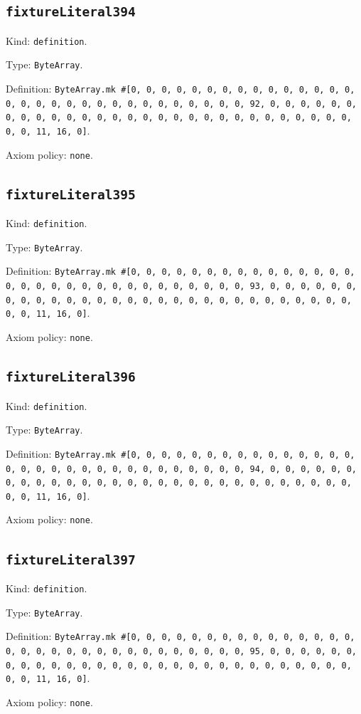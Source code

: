 \documentclass[11pt]{article}
\begin{document}
\subsection*{\texttt{fixtureLiteral394}}
\noindent Kind: \texttt{definition}.\par
\noindent Type: \texttt{ByteArray}.\par
\noindent Definition: \texttt{ByteArray.mk \#[0, 0, 0, 0, 0, 0, 0, 0, 0, 0, 0, 0, 0, 0, 0, 0, 0, 0, 0, 0, 0, 0, 0, 0, 0, 0, 0, 0, 0, 0, 0, 92, 0, 0, 0, 0, 0, 0, 0, 0, 0, 0, 0, 0, 0, 0, 0, 0, 0, 0, 0, 0, 0, 0, 0, 0, 0, 0, 0, 0, 0, 0, 0, 11, 16, 0]}.\par
\noindent Axiom policy: \texttt{none}.\par
\subsection*{\texttt{fixtureLiteral395}}
\noindent Kind: \texttt{definition}.\par
\noindent Type: \texttt{ByteArray}.\par
\noindent Definition: \texttt{ByteArray.mk \#[0, 0, 0, 0, 0, 0, 0, 0, 0, 0, 0, 0, 0, 0, 0, 0, 0, 0, 0, 0, 0, 0, 0, 0, 0, 0, 0, 0, 0, 0, 0, 93, 0, 0, 0, 0, 0, 0, 0, 0, 0, 0, 0, 0, 0, 0, 0, 0, 0, 0, 0, 0, 0, 0, 0, 0, 0, 0, 0, 0, 0, 0, 0, 11, 16, 0]}.\par
\noindent Axiom policy: \texttt{none}.\par
\subsection*{\texttt{fixtureLiteral396}}
\noindent Kind: \texttt{definition}.\par
\noindent Type: \texttt{ByteArray}.\par
\noindent Definition: \texttt{ByteArray.mk \#[0, 0, 0, 0, 0, 0, 0, 0, 0, 0, 0, 0, 0, 0, 0, 0, 0, 0, 0, 0, 0, 0, 0, 0, 0, 0, 0, 0, 0, 0, 0, 94, 0, 0, 0, 0, 0, 0, 0, 0, 0, 0, 0, 0, 0, 0, 0, 0, 0, 0, 0, 0, 0, 0, 0, 0, 0, 0, 0, 0, 0, 0, 0, 11, 16, 0]}.\par
\noindent Axiom policy: \texttt{none}.\par
\subsection*{\texttt{fixtureLiteral397}}
\noindent Kind: \texttt{definition}.\par
\noindent Type: \texttt{ByteArray}.\par
\noindent Definition: \texttt{ByteArray.mk \#[0, 0, 0, 0, 0, 0, 0, 0, 0, 0, 0, 0, 0, 0, 0, 0, 0, 0, 0, 0, 0, 0, 0, 0, 0, 0, 0, 0, 0, 0, 0, 95, 0, 0, 0, 0, 0, 0, 0, 0, 0, 0, 0, 0, 0, 0, 0, 0, 0, 0, 0, 0, 0, 0, 0, 0, 0, 0, 0, 0, 0, 0, 0, 11, 16, 0]}.\par
\noindent Axiom policy: \texttt{none}.\par
\end{document}
